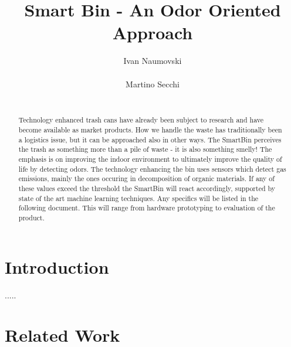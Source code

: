 \documentclass{sigchi}
\begin{document}
\title{Smart Bin - An Odor Oriented Approach}

\author{
  \alignauthor Ivan Naumovski\\
    \\
  \alignauthor Martino Secchi\\
    \\
}

\maketitle

\begin{abstract}
Technology enhanced trash cans have already been subject to research and have become available as market products.
How we handle the waste has traditionally been a logistics issue, but it can be approached also in other ways. The SmartBin perceives the trash as something more than a pile of waste - it is also something smelly!
The emphasis is on improving the indoor environment to ultimately improve the quality of life by detecting odors.
The technology enhancing the bin uses sensors which detect gas emissions, mainly the ones occuring in decomposition of organic materials.
If any of these values exceed the threshold the SmartBin will react accordingly, supported by state of the art machine learning techniques.
Any specifics will be listed in the following document. This will range from hardware prototyping to evaluation of the product.
\end{abstract}






\section{Introduction}
.....


\section{Related Work}
\end{document}
